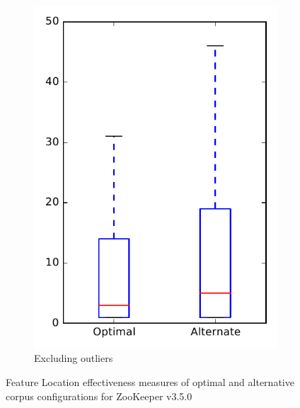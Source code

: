 \begin{figure}
\begin{subfigure}{.4\textwidth}
        \includegraphics[height=0.4\textheight]{figures/combo/flt_rq2_zookeeper_no_outlier}
        \caption{Excluding outliers}\label{fig:combo:flt:rq2:zookeeper_no_outlier}
    \end{subfigure}
\caption{Feature Location effectiveness measures of optimal and alternative corpus configurations for ZooKeeper v3.5.0}
\label{fig:combo:flt:rq2:zookeeper}
\end{figure}
